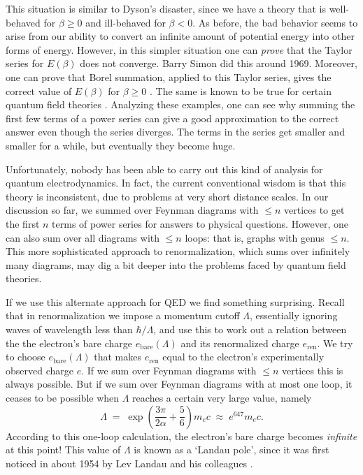 \documentclass[12pt]{article}
\newcommand{\bare}{\mathrm{bare}}
\newcommand{\ren}{\mathrm{ren}}
\begin{document}
This situation is similar to Dyson's disaster, since we have a theory that is well-behaved for $\beta \ge 0$ and ill-behaved for $\beta < 0$.  As before, the bad behavior seems to arise from our ability to convert an infinite amount of potential energy into other forms of energy.    However, in this simpler situation one can \emph{prove} that the Taylor series for $E(\beta)$ does not converge.  Barry Simon \cite{Simon1970} did this around 1969.  Moreover, one can prove that Borel summation, applied to this Taylor series, gives the correct value of $E(\beta)$ for $\beta \ge 0$ \cite{GGS}.  The same is known to be true for certain quantum field theories \cite{Rivasseau}.  Analyzing these examples, one can see why summing the first few terms of a power series can give a good approximation to the correct answer even though the series diverges.   The terms in the series get smaller and smaller for a while, but eventually they become huge.

Unfortunately, nobody has been able to carry out this kind of analysis for quantum electrodynamics.  In fact, the current conventional wisdom is that this theory is inconsistent, due to problems at very short distance scales.   In our discussion so far, we summed over Feynman diagrams with $\le n$ vertices to get the first $n$ terms of power series for answers to physical questions.  However, one can also sum over all diagrams with $\le n$ loops: that is, graphs with genus $\le n$.  This more sophisticated approach to renormalization, which sums over infinitely many diagrams, may dig a bit deeper into the problems faced by quantum field theories.   

If we use this alternate approach for QED we find something surprising.  Recall that
in renormalization we impose a momentum cutoff $\Lambda$, essentially ignoring waves of wavelength less than $\hbar/\Lambda$, and use this to work out a relation between the
the electron's bare charge $e_\bare(\Lambda)$ and its renormalized charge $e_\ren$.
We try to choose $e_\bare(\Lambda)$ that makes $e_\ren$ equal to the electron's experimentally observed charge $e$.   If we sum over Feynman diagrams with $\le n$ vertices this is always possible.  But if we sum over Feynman diagrams with at most one loop, it ceases to be possible when $\Lambda$ reaches a certain very large value, namely
\[     \Lambda \; = \; \exp\left(\frac{3 \pi}{2 \alpha} + \frac{5}{6}\right) m_e c \; \approx \; e^{647} m_e c. \] 
According to this one-loop calculation, the electron's bare charge becomes \emph{infinite} at this point!    This value of $\Lambda$ is known as a `Landau pole', since it was first noticed in about 1954 by Lev Landau and his colleagues \cite{Landau}.  
\end{document}
